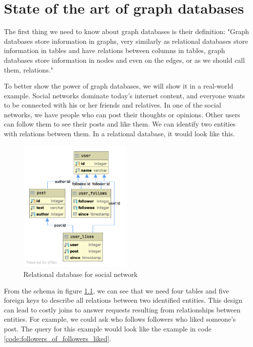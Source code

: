 \chapter {State of the art of graph databases}

The first thing we need to know about graph databases is their definition:
"Graph databases store information in graphs, very similarly as relational databases store information in tables and have relations between columns in tables, graph databases store information in nodes and even on the edges, or as we should call them, relations." \cite{morgante_what_2021}

To better show the power of graph databases, we will show it in a real-world example.
Social networks dominate today's internet content, and everyone wants to be connected with his or her friends and relatives.
In one of the social networks, we have people who can post their thoughts or opinions.
Other users can follow them to see their posts and like them.
We can identify two entities with relations between them.
In a relational database, it would look like this.

\begin{figure}[H]
    \centering
    \includegraphics[width=0.5\textwidth]{content/thesis-db.png}
    \caption{Relational database for social network}
    \label{fig:relscheme}
\end{figure}

From the schema in figure \ref{fig:relscheme}, we can see that we need four tables and five foreign keys to describe all relations between two identified entities.
This design can lead to costly joins to answer requests resulting from relationships between entities.
For example, we could ask who follows followers who liked someone's post.
The query for this example would look like the example in code \ref{code:followers_of_followers_liked}.

